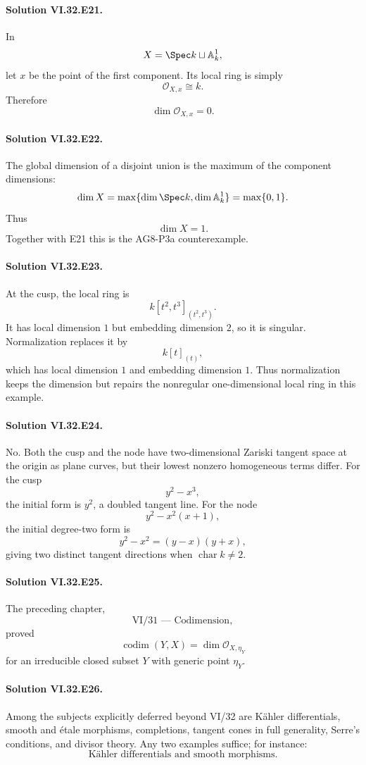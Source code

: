 \paragraph{Solution VI.32.E21.}
In
\[
X=\Spec k\sqcup\mathbb A^1_k,
\]
let \(x\) be the point of the first component.  Its local ring is simply
\[
\mathcal O_{X,x}\cong k.
\]
Therefore
\[
\boxed{\dim\mathcal O_{X,x}=0}.
\]

\paragraph{Solution VI.32.E22.}
The global dimension of a disjoint union is the maximum of the component dimensions:
\[
\dim X
=
\max\{\dim\Spec k,\dim\mathbb A^1_k\}
=
\max\{0,1\}.
\]
Thus
\[
\boxed{\dim X=1}.
\]
Together with E21 this is the AG8-P3a counterexample.

\paragraph{Solution VI.32.E23.}
At the cusp, the local ring is
\[
k[t^2,t^3]_{(t^2,t^3)}.
\]
It has local dimension \(1\) but embedding dimension \(2\), so it is singular.  Normalization replaces it by
\[
k[t]_{(t)},
\]
which has local dimension \(1\) and embedding dimension \(1\).  Thus normalization keeps the dimension but repairs
the nonregular one-dimensional local ring in this example.

\paragraph{Solution VI.32.E24.}\mbox{}\par
No.  Both the cusp and the node have two-dimensional Zariski tangent space at the origin as plane curves, but their
lowest nonzero homogeneous terms differ.  For the cusp
\[
y^2-x^3,
\]
the initial form is \(y^2\), a doubled tangent line.  For the node
\[
y^2-x^2(x+1),
\]
the initial degree-two form is
\[
y^2-x^2=(y-x)(y+x),
\]
giving two distinct tangent directions when \(\operatorname{char}k\ne2\).

\paragraph{Solution VI.32.E25.}
The preceding chapter,
\[
\boxed{\text{VI/31 — Codimension}},
\]
proved
\[
\operatorname{codim}(Y,X)
=
\dim\mathcal O_{X,\eta_Y}
\]
for an irreducible closed subset \(Y\) with generic point \(\eta_Y\).

\paragraph{Solution VI.32.E26.}\mbox{}\par
Among the subjects explicitly deferred beyond VI/32 are Kähler differentials, smooth and étale morphisms,
completions, tangent cones in full generality, Serre's conditions, and divisor theory.  Any two examples suffice;
for instance:
\[
\boxed{\text{Kähler differentials and smooth morphisms}.}
\]
